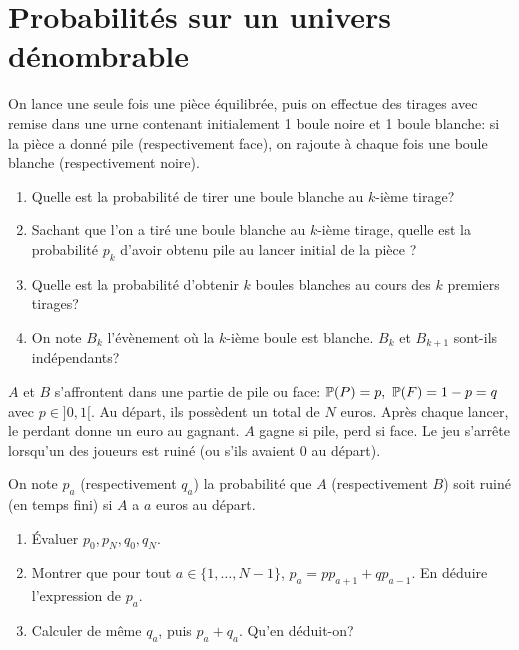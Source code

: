 \section{Probabilités sur un univers dénombrable}

\begin{exercise}
	On lance une seule fois une pièce équilibrée, puis on effectue des tirages
	avec remise dans une urne contenant initialement 1 boule noire et 1 boule
	blanche: si la pièce a donné pile (respectivement face), on rajoute à chaque
	fois une boule blanche (respectivement noire).
	\begin{enumerate}
		\item
		Quelle est la probabilité de tirer une boule blanche au $k$-ième tirage?
		\item
		Sachant que l'on a tiré une boule blanche au $k$-ième tirage, quelle est
		la probabilité $p_{k}$ d'avoir obtenu pile au lancer initial de la pièce ?
		\item
		Quelle est la probabilité d'obtenir $k$ boules blanches au cours des $k$
		premiers tirages?
		\item
		On note $B_{k}$ l'évènement où la $k$-ième boule est blanche. $B_{k}$ et
		$B_{k+1}$ sont-ils indépendants?
	\end{enumerate}
\end{exercise}

\begin{exercise}
	$A$ et $B$ s'affrontent dans une partie de pile ou face:
	$\P(P)=p,~\P(F)=1-p=q$ avec $p\in]0,1[$. Au départ, ils possèdent un total de
	$N$ euros. Après chaque lancer, le perdant donne un euro au gagnant. $A$ gagne
	si pile, perd si face. Le jeu s'arrête lorsqu'un des joueurs est ruiné (ou
	s'ils avaient 0 au départ).

	On note $p_{a}$ (respectivement $q_{a}$) la probabilité que $A$
	(respectivement $B$) soit ruiné (en temps fini) si $A$ a $a$ euros au départ.
	\begin{enumerate}
		\item
		Évaluer $p_{0},p_{N},q_{0},q_{N}$.
		\item
		Montrer que pour tout $a\in\{1,\dots,N-1\}$, $p_{a}=pp_{a+1}+qp_{a-1}$. En
		déduire l'expression de $p_{a}$.
		\item
		Calculer de même $q_{a}$, puis $p_{a}+q_{a}$. Qu'en déduit-on?
	\end{enumerate}
\end{exercise}

